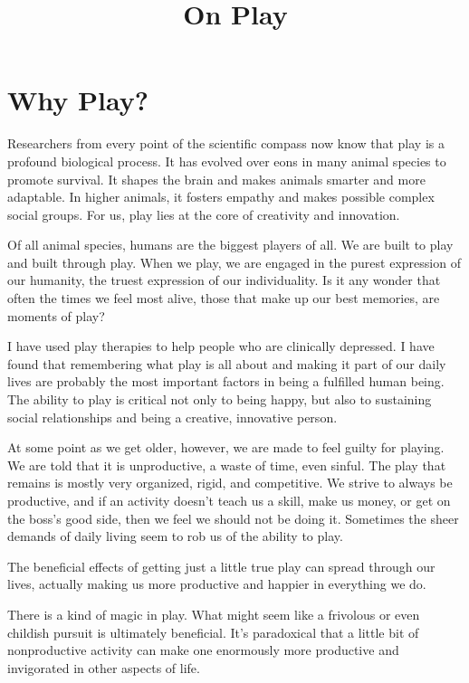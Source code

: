 \documentclass[ebook,12pt,oneside,openany]{memoir}
\begin{document}
\title{On Play}
\maketitle
\section{Why Play?}
Researchers from every point of the scientific compass now know that 
play is a profound biological process.
It has evolved over eons in many animal species to promote survival.
It shapes the brain and makes animals smarter and more adaptable.
In higher animals, it fosters empathy and makes possible complex social groups.
For us, play lies at the core of creativity and innovation.

Of all animal species, humans are the biggest players of all. 
We are built to play and built through play. 
When we play, we are engaged in the purest expression of our humanity, the truest expression of our individuality.
Is it any wonder that often the times we feel most alive, those that make up our best memories, are moments of play?

I have used play therapies to help people who are clinically depressed.
I have found that remembering what play is all about and making it part of our daily lives
are probably the most important factors in being a fulfilled human being.
The ability to play is critical not only to being happy, but also to sustaining social relationships and being a creative,
innovative person.

At some point as we get older, however, we are made to feel guilty for playing.
We are told that it is unproductive, a waste of time, even sinful.
The play that remains is mostly very organized, rigid, and competitive.
We strive to always be productive, and if an activity doesn't teach us a skill, make us money, or get on the boss's good side,
then we feel we should not be doing it.
Sometimes the sheer demands of daily living seem to rob us of the ability to play.

The beneficial effects of getting just a little true play can spread through our lives, actually making us more productive and happier in everything we do.

There is a kind of magic in play. 
What might seem like a frivolous or even childish pursuit is ultimately beneficial.
It's paradoxical that a little bit of nonproductive activity can make one enormously more productive and invigorated in other aspects of life.
\end{document}
